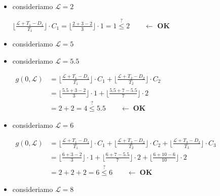 \begin{itemize}
    
    \item consideriamo $\mathcal{L} = 2$
    \begin{center}
        $\lfloor \frac{\mathcal{L} + T_1 - D_1}{T_1} \rfloor \cdot C_1 = \lfloor \frac{2 + 3 - 2}{3} \rfloor \cdot 1 = 1 \stackrel{\text{?}}{\leq} 2 \qquad \leftarrow $ \textbf{OK}
    \end{center}
    \item consideriamo $\mathcal{L} = 5$
    \item consideriamo $\mathcal{L} = 5.5$
    \begin{center}
        \begin{math}
            \begin{aligned}
                g(0, \mathcal{L}) &= \lfloor \frac{\mathcal{L} + T_1 - D_1}{T_1} \rfloor \cdot C_1 + \lfloor \frac{\mathcal{L} + T_2 - D_2}{T_2} \rfloor \cdot C_2 \\
                &= \lfloor \frac{5.5 + 3 - 2}{3} \rfloor \cdot 1 + \lfloor \frac{5.5 + 7 - 5.5}{7} \rfloor \cdot 2 \\
                &= 2 + 2 = 4 \stackrel{\text{?}}{\leq} 5.5 \qquad \leftarrow \; \mathbf{OK}
            \end{aligned}
        \end{math}
    \end{center}
    \item consideriamo $\mathcal{L} = 6$
    \begin{center}
        \begin{math}
            \begin{aligned}
                g(0, \mathcal{L}) &= \lfloor \frac{\mathcal{L} + T_1 - D_1}{T_1} \rfloor \cdot C_1 + \lfloor \frac{\mathcal{L} + T_2 - D_2}{T_2} \rfloor \cdot C_2 + \lfloor \frac{\mathcal{L} + T_3 - D_3}{T_3} \rfloor \cdot C_3 \\
                &= \lfloor \frac{6 + 3 - 2}{3} \rfloor \cdot 1 + \lfloor \frac{6 + 7 - 5.5}{7} \rfloor \cdot 2 + \lfloor \frac{6 + 10 - 6}{10} \rfloor \cdot 2 \\
                &= 2 + 2 + 2 = 6 \stackrel{\text{?}}{\leq} 6 \qquad \leftarrow \; \mathbf{OK}
            \end{aligned}
        \end{math}
    \end{center}
    \item consideriamo $\mathcal{L} = 8$
    \begin{center}

\end{center}
\end{itemize}

